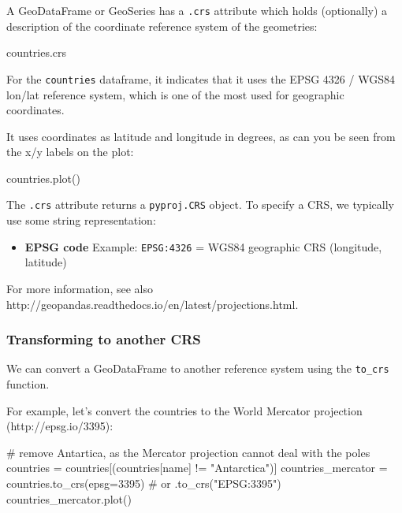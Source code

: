 \documentclass[
  letterpaper,
  DIV=11,
  numbers=noendperiod]{scrreprt}
\newenvironment{Shaded}{\begin{snugshade}}{\end{snugshade}}
\newcommand{\CommentTok}[1]{\textcolor[rgb]{0.37,0.37,0.37}{#1}}
\newcommand{\DecValTok}[1]{\textcolor[rgb]{0.68,0.00,0.00}{#1}}
\newcommand{\NormalTok}[1]{\textcolor[rgb]{0.00,0.23,0.31}{#1}}
\newcommand{\OperatorTok}[1]{\textcolor[rgb]{0.37,0.37,0.37}{#1}}
\newcommand{\StringTok}[1]{\textcolor[rgb]{0.13,0.47,0.30}{#1}}
\providecommand{\tightlist}{%
  \setlength{\itemsep}{0pt}\setlength{\parskip}{0pt}}\usepackage{longtable,booktabs,array}
\begin{document}
A GeoDataFrame or GeoSeries has a \texttt{.crs} attribute which holds
(optionally) a description of the coordinate reference system of the
geometries:

\begin{Shaded}
\begin{Highlighting}[]
\NormalTok{countries.crs}
\end{Highlighting}
\end{Shaded}

For the \texttt{countries} dataframe, it indicates that it uses the EPSG
4326 / WGS84 lon/lat reference system, which is one of the most used for
geographic coordinates.

It uses coordinates as latitude and longitude in degrees, as can you be
seen from the x/y labels on the plot:

\begin{Shaded}
\begin{Highlighting}[]
\NormalTok{countries.plot()}
\end{Highlighting}
\end{Shaded}

The \texttt{.crs} attribute returns a \texttt{pyproj.CRS} object. To
specify a CRS, we typically use some string representation:

\begin{itemize}
\tightlist
\item
  \textbf{EPSG code} Example: \texttt{EPSG:4326} = WGS84 geographic CRS
  (longitude, latitude)
\end{itemize}

For more information, see also
http://geopandas.readthedocs.io/en/latest/projections.html.

\subsubsection{Transforming to another
CRS}\label{transforming-to-another-crs}

We can convert a GeoDataFrame to another reference system using the
\texttt{to\_crs} function.

For example, let's convert the countries to the World Mercator
projection (http://epsg.io/3395):

\begin{Shaded}
\begin{Highlighting}[]
\CommentTok{\# remove Antartica, as the Mercator projection cannot deal with the poles}
\NormalTok{countries }\OperatorTok{=}\NormalTok{ countries[(countries[}\StringTok{\textquotesingle{}name\textquotesingle{}}\NormalTok{] }\OperatorTok{!=} \StringTok{"Antarctica"}\NormalTok{)]}
\NormalTok{countries\_mercator }\OperatorTok{=}\NormalTok{ countries.to\_crs(epsg}\OperatorTok{=}\DecValTok{3395}\NormalTok{)  }\CommentTok{\# or .to\_crs("EPSG:3395")}
\NormalTok{countries\_mercator.plot()}
\end{Highlighting}
\end{Shaded}
\end{document}
